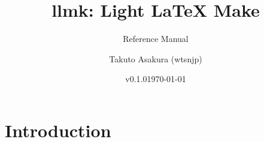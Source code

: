 \documentclass{llmk-doc}
\title{llmk: Light {\LaTeX} Make}
\author{Takuto Asakura (wtsnjp)}
\subtitle{Reference Manual}
\date{v0.1.0\quad\today}
\begin{document}
\maketitle

\section{Introduction}

\end{document}
